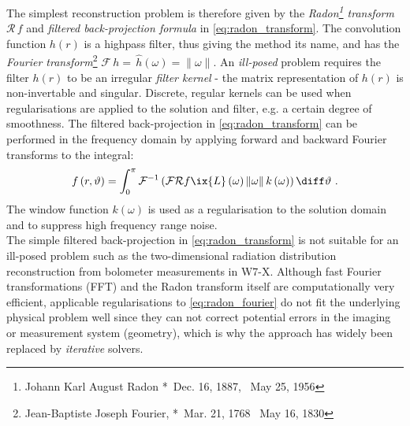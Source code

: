                 The simplest reconstruction problem is therefore given by the \textit{Radon\footnote[1]{Johann Karl August Radon *~Dec. 16, 1887, \textdagger~May 25, 1956} transform} $\mathcal{R}\,f$ and \textit{filtered back-projection formula} in \cref{eq:radon_transform}. The convolution function $h\left(r\right)$ is a highpass filter, thus giving the method its name, and has the \textit{Fourier transform}\footnote[2]{Jean-Baptiste Joseph Fourier, *~Mar. 21, 1768 \textdagger~May 16, 1830} $\mathcal{F}\,h=\,\mathrel{\hat{h}}\left(\omega\right)=\left\|\omega\right\|$\cite{Candes2021}. An \textit{ill-posed} problem requires the filter $h\left(r\right)$ to be an irregular \textit{filter kernel} - the matrix representation of $h\left(r\right)$ is non-invertable and singular. Discrete, regular kernels can be used when regularisations are applied to the solution and filter, e.g. a certain degree of smoothness. The filtered back-projection in \autoref{eq:radon_transform} can be performed in the frequency domain by applying forward and backward Fourier transforms to the integral:%
%
                \begin{align}%
                    f\left(r,\vartheta\right)=\int_{0}^{\pi}\mathcal{F}^{-1}\left(\mathcal{F}\mathcal{R}f\ix{L}\left(\omega\right)\left\|\omega\right\|k\left(\omega\right)\right)\diff\vartheta\,\,.\label{eq:radon_fourier}%
                \end{align}%
%
                The window function $k\left(\omega\right)$ is used as a regularisation to the solution domain and to suppress high frequency range noise\cite{Kabanikhin2008}.\\%
                The simple filtered back-projection in \cref{eq:radon_transform} is not suitable for an ill-posed problem such as the two-dimensional radiation distribution reconstruction from bolometer measurements in W7-X. Although fast Fourier transformations (FFT) and the Radon transform itself are computationally very efficient, applicable regularisations to \cref{eq:radon_fourier} do not fit the underlying physical problem well since they can not correct potential errors in the imaging or measurement system (geometry), which is why the approach has widely been replaced by \textit{iterative} solvers.\\%
